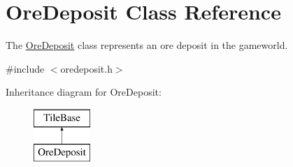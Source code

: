 \hypertarget{classOreDeposit}{\section{Ore\-Deposit Class Reference}
\label{classOreDeposit}
}


The \hyperlink{classOreDeposit}{Ore\-Deposit} class represents an ore deposit in the gameworld.  




{\ttfamily \#include $<$oredeposit.\-h$>$}

Inheritance diagram for Ore\-Deposit\-:\begin{figure}[H]
\begin{center}
\leavevmode
\includegraphics[height=2.000000cm]{classOreDeposit}
\end{center}
\end{figure}
